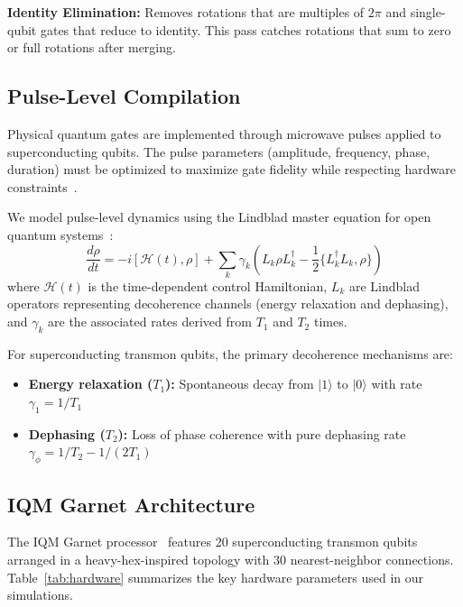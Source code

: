 \documentclass[journal]{IEEEtran}
\newcommand{\ham}{\mathcal{H}}
\begin{document}
\textbf{Identity Elimination:} Removes rotations that are multiples of $2\pi$ and single-qubit gates that reduce to identity. This pass catches rotations that sum to zero or full rotations after merging.

\subsection{Pulse-Level Compilation}

Physical quantum gates are implemented through microwave pulses applied to superconducting qubits. The pulse parameters (amplitude, frequency, phase, duration) must be optimized to maximize gate fidelity while respecting hardware constraints~\cite{motzoi2009simple}.

We model pulse-level dynamics using the Lindblad master equation for open quantum systems~\cite{lindblad1976generators}:
\begin{equation}
    \frac{d\rho}{dt} = -i[\ham(t), \rho] + \sum_k \gamma_k \left( L_k \rho L_k^{\dagger} - \frac{1}{2}\{L_k^{\dagger}L_k, \rho\} \right)
    \label{eq:lindblad}
\end{equation}
where $\ham(t)$ is the time-dependent control Hamiltonian, $L_k$ are Lindblad operators representing decoherence channels (energy relaxation and dephasing), and $\gamma_k$ are the associated rates derived from $T_1$ and $T_2$ times.

For superconducting transmon qubits, the primary decoherence mechanisms are:
\begin{itemize}
    \item \textbf{Energy relaxation ($T_1$):} Spontaneous decay from $|1\rangle$ to $|0\rangle$ with rate $\gamma_1 = 1/T_1$
    \item \textbf{Dephasing ($T_2$):} Loss of phase coherence with pure dephasing rate $\gamma_\phi = 1/T_2 - 1/(2T_1)$
\end{itemize}

\subsection{IQM Garnet Architecture}

The IQM Garnet processor~\cite{iqm2024garnet} features 20 superconducting transmon qubits arranged in a heavy-hex-inspired topology with 30 nearest-neighbor connections. Table~\ref{tab:hardware} summarizes the key hardware parameters used in our simulations.
\end{document}
